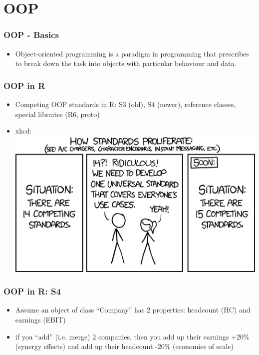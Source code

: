 \documentclass[bigger]{beamer}
\begin{document}
\section{OOP}
\label{sec-5}
\begin{frame}
\frametitle{OOP - Basics}
\label{sec-5-1}
\begin{itemize}

\item Object-oriented programming is a paradigm in programming that prescribes to break down the task into objects with particular behaviour and data.
\label{sec-5-1-1}%
\end{itemize} %
\end{frame}
\begin{frame}
\frametitle{OOP in R}
\label{sec-5-2}
\begin{itemize}

\item Competing OOP standards in R: S3 (old), S4 (newer), reference classes, special libraries (R6, proto)
\label{sec-5-2-1}%

\item xkcd:\\
\label{sec-5-2-2}%
\includegraphics[width=.9\linewidth]{./standards.png}
\end{itemize} %
\end{frame}
\begin{frame}
\frametitle{OOP in R: S4}
\label{sec-5-3}
\begin{itemize}

\item Assume an object of class ``Company'' has 2 properties: headcount (HC) and earnings (EBIT)
\label{sec-5-3-1}%

\item if you ``add'' (i.e. merge) 2 companies, then you add up their earnings +20\% (synergy effects) and add up their headcount -20\% (economies of scale)
\label{sec-5-3-2}%
\end{itemize} %
\end{frame}
\end{document}
